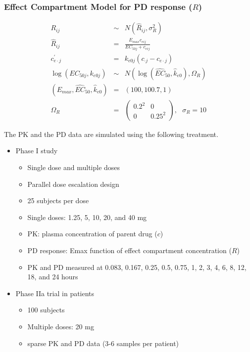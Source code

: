 \documentclass[11pt]{amsart}
\begin{document}
\subsubsection*{Effect Compartment Model for PD response ($R$)}
\begin{eqnarray*}
R_{ij} &\sim& N\left(\widehat{R}_{ij},\sigma_{R}^2\right) \\
\widehat{R}_{ij} &=& \frac{E_{max}c_{eij}}{EC_{50j} + c_{eij}} \\
c_{e\cdot j}^\prime &=& k_{e0j}\left(c_{\cdot j} - c_{e\cdot j}\right) \\
\log\left(EC_{50j}, k_{e0j}\right) &\sim& N\left(\log\left(\widehat{EC}_{50}, \widehat{k}_{e0}\right),\Omega_R\right) \\
\left(E_{max}, \widehat{EC}_{50},\widehat{k}_{e0}\right) &=& \left(100, 100.7, 1\right) \\
\Omega_R &=& \left(\begin{array}{cc} 0.2^2 & 0 \\ 0 & 0.25^2  \end{array}\right), \ \ \ \sigma_R = 10
\end{eqnarray*}

The PK and the PD data are simulated using the following treatment.
\begin{itemize}
  \item Phase I study
  \begin{itemize}
    \item Single dose and multiple doses
    \item Parallel dose escalation design
    \item 25 subjects per dose
    \item Single doses: 1.25, 5, 10, 20, and 40 mg 
    \item PK: plasma concentration of parent drug ($c$)
    \item PD response: Emax function of effect compartment concentration ($R$)
    \item PK and PD measured at 0.083, 0.167, 0.25, 0.5, 0.75, 1, 2, 3, 4, 6, 8, 12, 18, and 24 hours
  \end{itemize}
  \item Phase IIa trial in patients
  \begin{itemize}
    \item 100 subjects
    \item Multiple doses: 20 mg
    \item sparse PK and PD data (3-6 samples per patient)
  \end{itemize}
\end{itemize}
\end{document}
